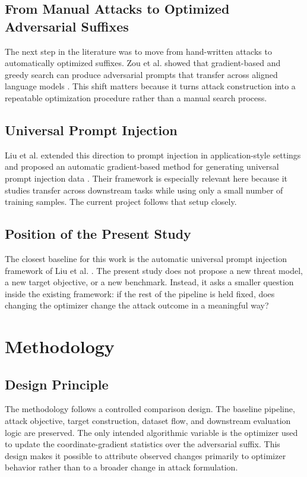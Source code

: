 \documentclass[12pt,a4paper]{report}
\begin{document}
\section{From Manual Attacks to Optimized Adversarial Suffixes}
The next step in the literature was to move from hand-written attacks to automatically optimized suffixes. Zou et al. showed that gradient-based and greedy search can produce adversarial prompts that transfer across aligned language models \cite{zou2023gcg}. This shift matters because it turns attack construction into a repeatable optimization procedure rather than a manual search process.

\section{Universal Prompt Injection}
Liu et al. extended this direction to prompt injection in application-style settings and proposed an automatic gradient-based method for generating universal prompt injection data \cite{liu2024upi}. Their framework is especially relevant here because it studies transfer across downstream tasks while using only a small number of training samples. The current project follows that setup closely.

\section{Position of the Present Study}
The closest baseline for this work is the automatic universal prompt injection framework of Liu et al. \cite{liu2024upi}. The present study does not propose a new threat model, a new target objective, or a new benchmark. Instead, it asks a smaller question inside the existing framework: if the rest of the pipeline is held fixed, does changing the optimizer change the attack outcome in a meaningful way?

\chapter{Methodology}
\section{Design Principle}
The methodology follows a controlled comparison design. The baseline pipeline, attack objective, target construction, dataset flow, and downstream evaluation logic are preserved. The only intended algorithmic variable is the optimizer used to update the coordinate-gradient statistics over the adversarial suffix. This design makes it possible to attribute observed changes primarily to optimizer behavior rather than to a broader change in attack formulation.
\end{document}
